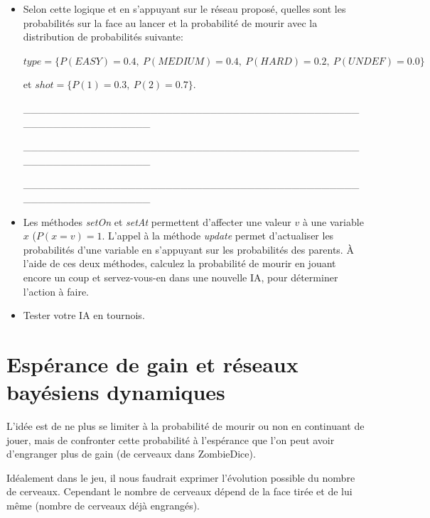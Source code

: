 \documentclass[a4paper, 10pt]{article}
\begin{document}
\begin{itemize}[$\bigcirc$]
    \item Selon cette logique et en s'appuyant sur le réseau proposé, quelles sont les probabilités sur la face au lancer et la probabilité de mourir avec la distribution de probabilités suivante:

    $\mathit{type}= \{P(\mathit{EASY})= 0.4,\ P(\mathit{MEDIUM})= 0.4,\ P(\mathit{HARD})= 0.2,\ P(\mathit{UNDEF})= 0.0\}$

    et $\mathit{shot}= \{P(1)= 0.3,\ P(2)= 0.7\}$.

\medskip

\_\_\_\_\_\_\_\_\_\_\_\_\_\_\_\_\_\_\_\_\_\_\_\_\_\_\_\_\_\_\_\_\_\_\_\_\_\_\_\_\_\_\_\_\_\_\_\_\_\_\_\_\_\_\_\_\_\_\_\_\_\_

\medskip

\_\_\_\_\_\_\_\_\_\_\_\_\_\_\_\_\_\_\_\_\_\_\_\_\_\_\_\_\_\_\_\_\_\_\_\_\_\_\_\_\_\_\_\_\_\_\_\_\_\_\_\_\_\_\_\_\_\_\_\_\_\_

\medskip

\_\_\_\_\_\_\_\_\_\_\_\_\_\_\_\_\_\_\_\_\_\_\_\_\_\_\_\_\_\_\_\_\_\_\_\_\_\_\_\_\_\_\_\_\_\_\_\_\_\_\_\_\_\_\_\_\_\_\_\_\_\_

\medskip
    \item Les méthodes \emph{setOn} et \emph{setAt} permettent d'affecter une valeur $v$ à une variable $x$ ($P(x=v)= 1$. L'appel à la méthode \emph{update} permet d'actualiser les probabilités d'une variable en s'appuyant sur les probabilités des parents.
    À l'aide de ces deux méthodes, calculez la probabilité de mourir en jouant encore un coup et servez-vous-en dans une nouvelle IA, pour déterminer l'action à faire.

    \item Tester votre IA en tournois.
\end{itemize}

  \section{Espérance de gain et réseaux bayésiens dynamiques}

  L'idée est de ne plus se limiter à la probabilité de mourir ou non en continuant de jouer, mais de confronter cette probabilité à l'espérance que l'on peut avoir d'engranger plus de gain (de cerveaux dans ZombieDice).

  Idéalement dans le jeu, il nous faudrait exprimer l'évolution possible du nombre de cerveaux.
  Cependant le nombre de cerveaux dépend de la face tirée et de lui même (nombre de cerveaux déjà engrangés).
\end{document}
